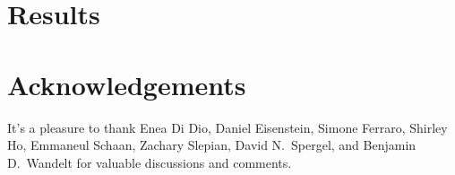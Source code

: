 \documentclass[12pt, letterpaper, preprint]{aastex62}
\begin{document}





 

\section{Results} \label{sec:results} 
 
 

 

\section*{Acknowledgements}
It's a pleasure to thank 
    Enea Di Dio, 
    Daniel Eisenstein, 
    Simone Ferraro, 
    Shirley Ho, 
    Emmaneul Schaan, 
    Zachary Slepian, 
    David N.~Spergel, 
    and Benjamin D.~Wandelt
    for valuable discussions and comments. 

\appendix
 



 
\end{document}
